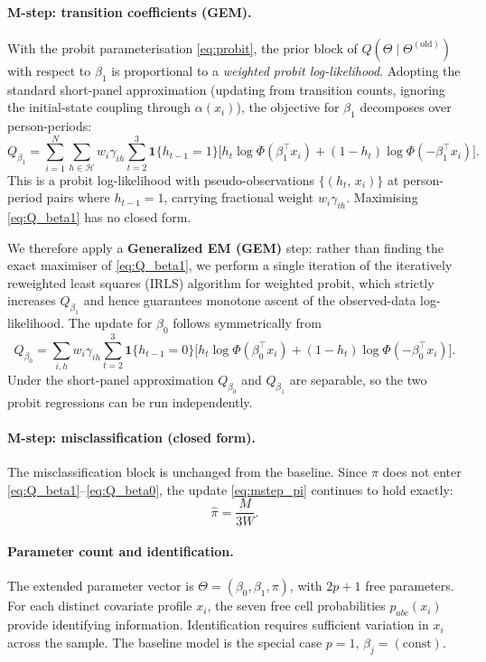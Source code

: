 \documentclass[12pt]{article}
\begin{document}
\paragraph{M-step: transition coefficients (GEM).}
With the probit parameterisation \eqref{eq:probit}, the prior block of
\(Q(\Theta \mid \Theta^{(\text{old})})\) with respect to \(\beta_1\) is
proportional to a \emph{weighted probit log-likelihood}. Adopting the
standard short-panel approximation (updating from transition counts,
ignoring the initial-state coupling through \(\alpha(x_i)\)), the
objective for \(\beta_1\) decomposes over person-periods:
\begin{equation}
Q_{\beta_1} = \sum_{i=1}^{N} \sum_{h \in \mathcal{H}} w_i \gamma_{ih}
  \sum_{t=2}^{3} \mathbf{1}\{h_{t-1} = 1\}
  \Big[
    h_t \log \Phi(\beta_1^\top x_i)
    + (1 - h_t) \log \Phi(-\beta_1^\top x_i)
  \Big].
\label{eq:Q_beta1}
\end{equation}
This is a probit log-likelihood with pseudo-observations
\(\{(h_t,\, x_i)\}\) at person-period pairs where \(h_{t-1} = 1\),
carrying fractional weight \(w_i \gamma_{ih}\). Maximising
\eqref{eq:Q_beta1} has no closed form.

We therefore apply a \textbf{Generalized EM (GEM)} step: rather than
finding the exact maximiser of \eqref{eq:Q_beta1}, we perform a single
iteration of the iteratively reweighted least squares (IRLS) algorithm
for weighted probit, which strictly increases \(Q_{\beta_1}\) and
hence guarantees monotone ascent of the observed-data log-likelihood.
The update for \(\beta_0\) follows symmetrically from
\begin{equation}
Q_{\beta_0} = \sum_{i,h} w_i \gamma_{ih}
  \sum_{t=2}^{3} \mathbf{1}\{h_{t-1} = 0\}
  \Big[
    h_t \log \Phi(\beta_0^\top x_i)
    + (1 - h_t) \log \Phi(-\beta_0^\top x_i)
  \Big].
\label{eq:Q_beta0}
\end{equation}
Under the short-panel approximation \(Q_{\beta_0}\) and \(Q_{\beta_1}\)
are separable, so the two probit regressions can be run independently.

\paragraph{M-step: misclassification (closed form).}
The misclassification block is unchanged from the baseline. Since
\(\pi\) does not enter \eqref{eq:Q_beta1}--\eqref{eq:Q_beta0}, the
update \eqref{eq:mstep_pi} continues to hold exactly:
\[
\hat{\pi} = \frac{M}{3W}.
\]

\paragraph{Parameter count and identification.}
The extended parameter vector is \(\Theta = (\beta_0, \beta_1, \pi)\),
with \(2p + 1\) free parameters. For each distinct covariate profile
\(x_i\), the seven free cell probabilities \(p_{abc}(x_i)\) provide
identifying information. Identification requires sufficient variation in
\(x_i\) across the sample. The baseline model is the special case
\(p = 1\), \(\beta_j = (\text{const})\).
\end{document}
